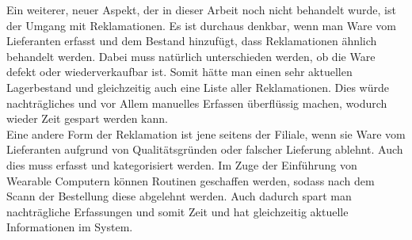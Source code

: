 Ein weiterer, neuer Aspekt, der in dieser Arbeit noch nicht behandelt wurde, ist der Umgang mit Reklamationen. Es ist durchaus denkbar, wenn man Ware vom Lieferanten erfasst und dem Bestand hinzufügt, dass Reklamationen ähnlich behandelt werden. Dabei muss natürlich unterschieden werden, ob die Ware defekt oder wiederverkaufbar ist. Somit hätte man einen sehr aktuellen Lagerbestand und gleichzeitig auch eine Liste aller Reklamationen. Dies würde nachträgliches und vor Allem manuelles Erfassen überflüssig machen, wodurch wieder Zeit gespart werden kann. \\

Eine andere Form der Reklamation ist jene seitens der Filiale, wenn sie Ware vom Lieferanten aufgrund von Qualitätsgründen oder falscher Lieferung ablehnt. Auch dies muss erfasst und kategorisiert werden. Im Zuge der Einführung von Wearable Computern können Routinen geschaffen werden, sodass nach dem Scann der Bestellung diese abgelehnt werden. Auch dadurch spart man nachträgliche Erfassungen und somit Zeit und hat gleichzeitig aktuelle Informationen im System.
%
